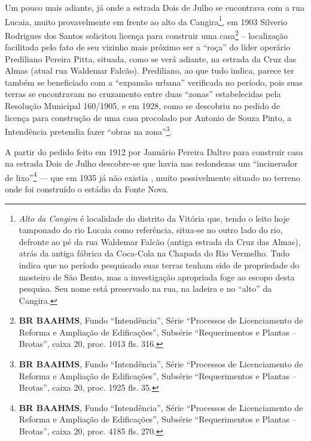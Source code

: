 Um pouco mais adiante, já onde a estrada Dois de Julho se encontrava com a rua Lucaia, muito provavelmente em frente ao alto da Cangira\footnote{\textit{Alto da Cangira} é localidade do distrito da Vitória que, tendo o leito hoje tamponado do rio Lucaia como referência, situa-se no outro lado do rio, defronte ao pé da rua Waldemar Falcão (antiga estrada da Cruz das Almas), atrás da antiga fábrica da Coca-Cola na Chapada do Rio Vermelho. Tudo indica que no período pesquisado suas terras tenham sido de propriedade do mosteiro de São Bento, mas a investigação apropriada foge ao escopo desta pesquisa. Seu nome está preservado na rua, na ladeira e no ``alto'' da Cangira.}, em 1903 Silverio Rodrigues dos Santos solicitou licença para construir uma casa\footnote{\textbf{BR BAAHMS}, Fundo ``Intendência'', Série ``Processos de Licenciamento de Reforma e Ampliação de Edificações'', Subsérie ``Requerimentos e Plantas -- Brotas'', caixa 20, proc. 1013 fls. 316.} -- localização facilitada pelo fato de seu vizinho mais próximo ser a ``roça'' do líder operário Prediliano Pereira Pitta, situada, como se verá adiante, na estrada da Cruz das Almas (atual rua Waldemar Falcão). Prediliano, ao que tudo indica, parece ter também se beneficiado com a ``expansão urbana'' verificada no período, pois suas terras se encontravam no cruzamento entre duas ``zonas'' estabelecidas pela Resolução Municipal 160/1905, e em 1928, como se descobriu no pedido de licença para construção de uma casa procolado por Antonio de Souza Pinto, a Intendência pretendia fazer ``obras na zona''\footnote{\textbf{BR BAAHMS}, Fundo ``Intendência'', Série ``Processos de Licenciamento de Reforma e Ampliação de Edificações'', Subsérie ``Requerimentos e Plantas -- Brotas'', caixa 20, proc. 1925 fls. 35.}.


A partir do pedido feito em 1912 por Januário Pereira Daltro para construir casa na estrada Dois de Julho descobre-se que havia nas redondezas um ``incinerador de lixo''\footnote{\textbf{BR BAAHMS}, Fundo ``Intendência'', Série ``Processos de Licenciamento de Reforma e Ampliação de Edificações'', Subsérie ``Requerimentos e Plantas -- Brotas'', caixa 20, proc. 4185 fls. 270.} ---  que em 1935 já não existia \cite{souza_guia_1935}, muito possivelmente situado no terreno onde foi construído o estádio da Fonte Nova. 


